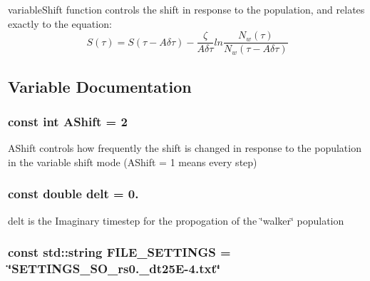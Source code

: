 variable\-Shift function controls the shift in response to the population, and relates exactly to the equation\-: \[ S(\tau) = S(\tau - A\delta \tau) - \frac{\zeta}{A \delta \tau} ln\frac{N_w (\tau)}{N_w (\tau - A\delta \tau)} \] 

\subsection{Variable Documentation}
\hypertarget{UEG__MAIN__binarytest_8C_a1b1b50ff28122bf25bbd141938893243}{
\subsubsection[{A\-Shift}]{\setlength{\rightskip}{0pt plus 5cm}const int A\-Shift = 2}}\label{UEG__MAIN__binarytest_8C_a1b1b50ff28122bf25bbd141938893243}
A\-Shift controls how frequently the shift is changed in response to the population in the variable shift mode (A\-Shift = 1 means every step) \hypertarget{UEG__MAIN__binarytest_8C_aa06f5594efa32a5569766c36690b4a22}{
\subsubsection[{delt}]{\setlength{\rightskip}{0pt plus 5cm}const double delt = 0.}}\label{UEG__MAIN__binarytest_8C_aa06f5594efa32a5569766c36690b4a22}
delt is the Imaginary timestep for the propogation of the \char`\"{}walker\char`\"{} population \hypertarget{UEG__MAIN__binarytest_8C_aa87b0f6d11261495ace185e6d5fcdcb5}{
\subsubsection[{F\-I\-L\-E\-\_\-\-S\-E\-T\-T\-I\-N\-G\-S}]{\setlength{\rightskip}{0pt plus 5cm}const std\-::string F\-I\-L\-E\-\_\-\-S\-E\-T\-T\-I\-N\-G\-S = \char`\"{}S\-E\-T\-T\-I\-N\-G\-S\-\_\-S\-O\-\_\-rs0.\-\_\-dt25\-E-\/4.txt\char`\"{}}}\label{UEG__MAIN__binarytest_8C_aa87b0f6d11261495ace185e6d5fcdcb5}
